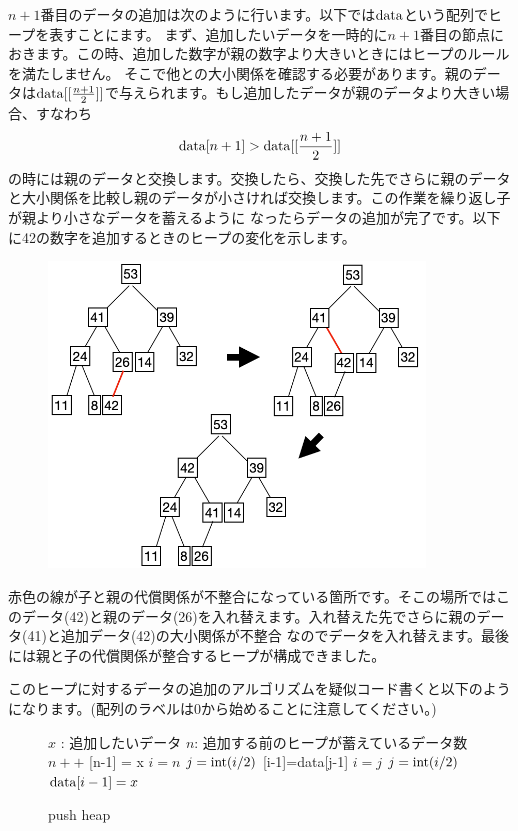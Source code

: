 \documentclass[dvipdfmx,pic,eepic,ecltree]{jarticle}
\begin{document}
$n+1$番目のデータの追加は次のように行います。以下では${\rm data}$という配列でヒープを表すことにます。
まず、追加したいデータを一時的に$n+1$番目の節点におきます。この時、追加した数字が親の数字より大きいときにはヒープのルールを満たしません。
そこで他との大小関係を確認する必要があります。親のデータは${\rm data}[[\frac{n+1}{2}]]$で与えられます。もし追加したデータが親のデータより大きい場合、すなわち
\begin{eqnarray}
{\rm data}[n+1]>{\rm data}[[\frac{n+1}{2}]]
\end{eqnarray}
の時には親のデータと交換します。交換したら、交換した先でさらに親のデータと大小関係を比較し親のデータが小さければ交換します。この作業を繰り返し子が親より小さなデータを蓄えるように
なったらデータの追加が完了です。以下に42の数字を追加するときのヒープの変化を示します。
 \begin{figure}[H]
 \begin{center}
\includegraphics[width=100mm]{heap_append_example.png}
\end{center}
\end{figure}
赤色の線が子と親の代償関係が不整合になっている箇所です。そこの場所ではこのデータ(42)と親のデータ(26)を入れ替えます。入れ替えた先でさらに親のデータ(41)と追加データ(42)の大小関係が不整合
なのでデータを入れ替えます。最後には親と子の代償関係が整合するヒープが構成できました。

このヒープに対するデータの追加のアルゴリズムを疑似コード書くと以下のようになります。(配列のラベルは0から始めることに注意してください。)
\begin{figure}[H]
\begin{algorithm}[H]
	\caption{push heap}
	\label{push heap}
	\begin{algorithmic}[1]
	\STATE $x$ : 追加したいデータ 
	\STATE $n$: 追加する前のヒープが蓄えているデータ数
	\STATE $n ++$
	[n-1] = x
	\STATE $i=n$
	\STATE $j={\rm int}(i/2)$
	[i-1]={\rm data}[j-1]
	\STATE $i=j$
	\STATE $j = {\rm int}(i/2)$
	\ENDWHILE
	\STATE ${\rm data}[i-1] = x$
	\end{algorithmic}
\end{algorithm}
\end{figure}
\end{document}
